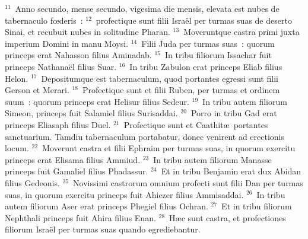 ${}^{11}$~Anno secundo, mense secundo, vigesima die mensis, elevata est nubes de tabernaculo fœderis~:
${}^{12}$~profectique sunt filii Isra\"el per turmas suas de deserto Sinai, et recubuit nubes in solitudine Pharan.
${}^{13}$~Moveruntque castra primi juxta imperium Domini in manu Moysi.
${}^{14}$~Filii Juda per turmas suas~: quorum princeps erat Nahasson filius Aminadab.
${}^{15}$~In tribu filiorum Issachar fuit princeps Nathana\"el filius Suar.
${}^{16}$~In tribu Zabulon erat princeps Eliab filius Helon.
${}^{17}$~Depositumque est tabernaculum, quod portantes egressi sunt filii Gerson et Merari.
${}^{18}$~Profectique sunt et filii Ruben, per turmas et ordinem suum~: quorum princeps erat Helisur filius Sedeur.
${}^{19}$~In tribu autem filiorum Simeon, princeps fuit Salamiel filius Surisaddai.
${}^{20}$~Porro in tribu Gad erat princeps Eliasaph filius Duel.
${}^{21}$~Profectique sunt et Caathit\ae\ portantes sanctuarium. Tamdiu tabernaculum portabatur, donec venirent ad erectionis locum.
${}^{22}$~Moverunt castra et filii Ephraim per turmas suas, in quorum exercitu princeps erat Elisama filius Ammiud.
${}^{23}$~In tribu autem filiorum Manasse princeps fuit Gamaliel filius Phadassur.
${}^{24}$~Et in tribu Benjamin erat dux Abidan filius Gedeonis.
${}^{25}$~Novissimi castrorum omnium profecti sunt filii Dan per turmas suas, in quorum exercitu princeps fuit Ahiezer filius Ammisaddai.
${}^{26}$~In tribu autem filiorum Aser erat princeps Phegiel filius Ochran.
${}^{27}$~Et in tribu filiorum Nephthali princeps fuit Ahira filius Enan.
${}^{28}$~H\ae c sunt castra, et profectiones filiorum Isra\"el per turmas suas quando egrediebantur.



